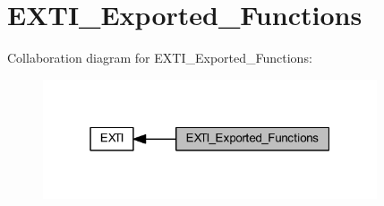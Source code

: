 \hypertarget{group___e_x_t_i___exported___functions}{}\section{E\+X\+T\+I\+\_\+\+Exported\+\_\+\+Functions}
\label{group___e_x_t_i___exported___functions}
Collaboration diagram for E\+X\+T\+I\+\_\+\+Exported\+\_\+\+Functions\+:
\nopagebreak
\begin{figure}[H]
\begin{center}
\leavevmode
\includegraphics[width=280pt]{group___e_x_t_i___exported___functions}
\end{center}
\end{figure}
